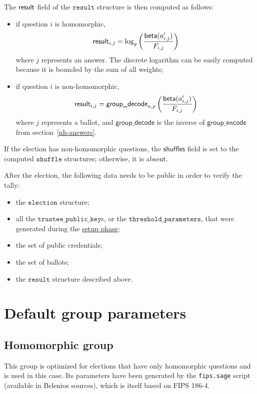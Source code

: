 \documentclass[a4paper]{article}
\newcommand{\tpk}{\texttt{trustee\_public\_key}}
\newcommand{\election}{\texttt{election}}
\newcommand{\result}{\texttt{result}}
\begin{document}
The $\textsf{result}$ field of the $\result$ structure is then computed
as follows:
\begin{itemize}
\item if question $i$ is homomorphic,
  \[
    \textsf{result}_{i,j}=\log_g\left(\frac{\textsf{beta}(a'_{i,j})}{F_{i,j}}\right)
  \]
  where $j$ represents an answer. The discrete logarithm can be easily
  computed because it is bounded by the sum of all weights;
\item if question $i$ is non-homomorphic,
  \[
    \textsf{result}_{i,j}=\textsf{group\_decode}_{\kappa,p}\left(\frac{\textsf{beta}(a'_{i,j})}{F_{i,j}}\right)
  \]
  where $j$ represents a ballot, and $\textsf{group\_decode}$ is the
  inverse of $\textsf{group\_encode}$ from section~\ref{nh-answers}.
\end{itemize}
If the election has non-homomorphic questions, the $\textsf{shuffles}$
field is set to the computed $\texttt{shuffle}$ structures; otherwise,
it is absent.

After the election, the following data needs to be public in order to
verify the tally:
\begin{itemize}
\item the $\election$ structure;
\item all the $\tpk$s, or the $\texttt{threshold\_parameters}$, that
  were generated during the \hyperref[election-setup]{setup phase};
\item the set of public credentials;
\item the set of ballots;
\item the $\result$ structure described above.
\end{itemize}

\section{Default group parameters}
\label{default-group}

\subsection{Homomorphic group}
\label{h-group}

This group is optimized for elections that have only homomorphic
questions and is used in this case. Its parameters have been generated
by the \verb=fips.sage= script (available in Belenios sources), which
is itself based on FIPS 186-4.
\end{document}
